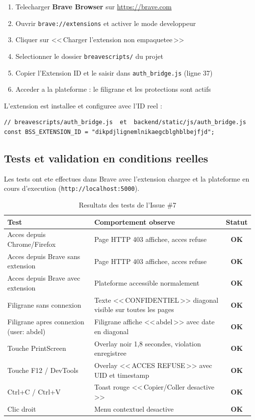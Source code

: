 \documentclass[12pt,a4paper]{article}
\newcommand{\ok}{\textcolor{green!60!black}{\textbf{OK}}}
\begin{document}
\begin{enumerate}
  \item Telecharger \textbf{Brave Browser} sur \url{https://brave.com}
  \item Ouvrir \texttt{brave://extensions} et activer le mode developpeur
  \item Cliquer sur <<\,Charger l'extension non empaquetee\,>>
  \item Selectionner le dossier \texttt{breavescripts/} du projet
  \item Copier l'Extension ID et le saisir dans \texttt{auth\_bridge.js} (ligne 37)
  \item Acceder a la plateforme : le filigrane et les protections sont actifs
\end{enumerate}

L'extension est installee et configuree avec l'ID reel :

\begin{lstlisting}
// breavescripts/auth_bridge.js  et  backend/static/js/auth_bridge.js
const BSS_EXTENSION_ID = "dikpdjlignemlnikaegcblghblbejfjd";
\end{lstlisting}

\subsection{Tests et validation en conditions reelles}

Les tests ont ete effectues dans Brave avec l'extension chargee et la plateforme
en cours d'execution (\texttt{http://localhost:5000}).

\begin{table}[H]
\centering
\caption{Resultats des tests de l'Issue \#7}
\begin{tabularx}{\textwidth}{@{}lXc@{}}
\toprule
\textbf{Test} & \textbf{Comportement observe} & \textbf{Statut} \\
\midrule
Acces depuis Chrome/Firefox
  & Page HTTP 403 affichee, acces refuse
  & \ok \\
Acces depuis Brave sans extension
  & Page HTTP 403 affichee, acces refuse
  & \ok \\
Acces depuis Brave avec extension
  & Plateforme accessible normalement
  & \ok \\
Filigrane sans connexion
  & Texte <<\,CONFIDENTIEL\,>> diagonal visible sur toutes les pages
  & \ok \\
Filigrane apres connexion (user: abdel)
  & Filigrane affiche <<\,abdel\,>> avec date en diagonal
  & \ok \\
Touche PrintScreen
  & Overlay noir 1,8 secondes, violation enregistree
  & \ok \\
Touche F12 / DevTools
  & Overlay <<\,ACCES REFUSE\,>> avec UID et timestamp
  & \ok \\
Ctrl+C / Ctrl+V
  & Toast rouge <<\,Copier/Coller desactive\,>>
  & \ok \\
Clic droit
  & Menu contextuel desactive
  & \ok \\
\bottomrule
\end{tabularx}
\end{table}
\end{document}
